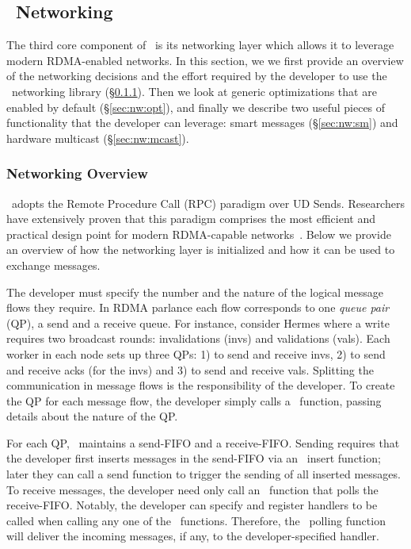 \subsection{\odlib~Networking} \label{sec:nw}
The third core component of \odlib\ is its networking layer which  allows it to leverage modern RDMA-enabled networks. 
In this section, we we first provide an overview of the networking decisions and the effort required by the developer to use the \odlib~networking library (\S\ref{sec:nw:ov}). Then we look at generic optimizations that are enabled by default (\S\ref{sec:nw:opt}), and finally we describe two useful pieces of functionality that the developer can leverage: smart messages (\S\ref{sec:nw:sm}) and hardware multicast (\S\ref{sec:nw:mcast}).

\subsubsection{Networking Overview} \label{sec:nw:ov}


\odlib\ adopts the Remote Procedure Call (RPC) paradigm over UD Sends. Researchers have extensively proven that this paradigm comprises the most efficient and practical design point for modern RDMA-capable networks~\cite{Kalia:2014, Kalia:2016, F-Kalia:2016, Kalia:2019}.
Below we provide an overview of how the networking layer is initialized and how it can be used to exchange messages.

The developer must specify the number and the nature of the logical message flows they require.
In RDMA parlance each flow corresponds to one \emph{queue pair} (QP), \ie a send and a receive queue. 
For instance, consider  Hermes  where a write requires two broadcast rounds: invalidations (invs) and validations (vals).
Each worker in each node sets up three QPs:  1) to send and receive invs, 2) to send and receive acks (for the invs) and 3) to send and receive vals.
Splitting the communication in message flows is the responsibility of the developer. To create the QP for each message flow, the developer simply calls a \odlib~function, passing details about the nature of the QP. %


For each QP, \odlib\ maintains a send-FIFO and a receive-FIFO.
Sending requires that the developer first inserts messages in the send-FIFO via an \odlib~insert function; later they can call a send function to trigger the sending of all inserted messages.
To receive messages, the developer need only call an \odlib~function that polls the receive-FIFO. 
Notably, the developer can specify and register handlers to be called when calling any one of the \odlib~functions. 
Therefore, the \odlib~polling function will deliver the incoming messages, if any, to the developer-specified handler.


